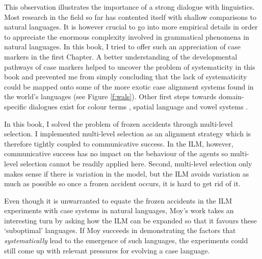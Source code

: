 This observation illustrates the importance of a strong dialogue with linguistics. Most research in the field so far has contented itself with shallow comparisons to natural languages. It is however crucial to go into more empirical details in order to appreciate the enormous complexity involved in grammatical phenomena in natural languages. In this book, I tried to offer such an appreciation of case markers in the first Chapter. A better understanding of the developmental pathways of case markers helped to uncover the problem of systematicity in this book and prevented me from simply concluding that the lack of systematicity could be mapped onto some of the more exotic case alignment systems found in the world's languages (see Figure \ref{f:wals}). Other first steps towards domain-specific dialogues exist for colour terms \citep{steels05coordinating}, spatial language \citep{loetzsch08typological} and vowel systems \citep{deboer99self}.

In this book, I solved the problem of frozen accidents through multi-level selection. I implemented multi-level selection as an alignment strategy which is therefore tightly coupled to communicative success. In the ILM, however, communicative success has no impact on the behaviour of the agents so multi-level selection cannot be readily applied here. Second, multi-level selection only makes sense if there is variation in the model, but the ILM avoids variation as much as possible so once a frozen accident occurs, it is hard to get rid of it.

Even though it is unwarranted to equate the frozen accidents in the ILM experiments with case systems in natural languages, Moy's work takes an interesting turn by asking how the ILM can be expanded so that it favours these `suboptimal' languages. If Moy succeeds in demonstrating the factors that {\em systematically} lead to the emergence of such languages, the experiments could still come up with relevant pressures for evolving a case language.


